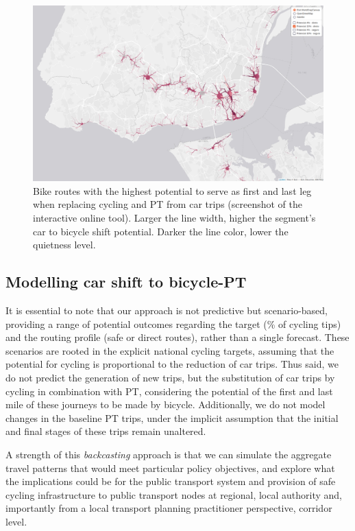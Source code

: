 \documentclass[review, doubleblind, 3p,
authoryear]{elsarticle} %
\begin{document}
\begin{figure}

{\centering \includegraphics[width=0.8\linewidth,]{img/map2} 

}

\caption{Bike routes with the highest potential to serve as first and last leg when replacing cycling and PT from car trips (screenshot of the interactive online tool). Larger the line width, higher the segment's car to bicycle shift potential. Darker the line color, lower the quietness level.}\label{fig:map2}
\end{figure}

\subsection{Modelling car shift to
bicycle-PT}\label{modelling-car-shift-to-bicycle-pt}

It is essential to note that our approach is not predictive but
scenario-based, providing a range of potential outcomes regarding the
target (\% of cycling tips) and the routing profile (safe or direct
routes), rather than a single forecast. These scenarios are rooted in
the explicit national cycling targets, assuming that the potential for
cycling is proportional to the reduction of car trips. Thus said, we do
not predict the generation of new trips, but the substitution of car
trips by cycling in combination with PT, considering the potential of
the first and last mile of these journeys to be made by bicycle.
Additionally, we do not model changes in the baseline PT trips, under
the implicit assumption that the initial and final stages of these trips
remain unaltered.

A strength of this \emph{backcasting} approach is that we can simulate
the aggregate travel patterns that would meet particular policy
objectives, and explore what the implications could be for the public
transport system and provision of safe cycling infrastructure to public
transport nodes at regional, local authority and, importantly from a
local transport planning practitioner perspective, corridor level.
\end{document}
